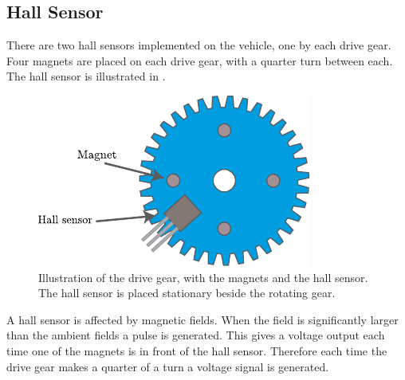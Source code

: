 \subsection{Hall Sensor}
There are two hall sensors implemented on the vehicle, one by each drive gear. Four magnets are placed on each drive gear, with a quarter turn between each. The hall sensor is illustrated in .

\begin{figure}[H]
	\centering
	\includegraphics[scale=1.2]{figures/hallSensorDrawing.pdf}
	\caption{Illustration of the drive gear, with the magnets and the hall sensor. The hall sensor is placed stationary beside the rotating gear\cite{KHSoerensen}.}
	\label{HallSensor}
\end{figure}

A hall sensor is affected by magnetic fields. When the field is significantly larger than the ambient fields a pulse is generated. This gives a voltage output each time one of the magnets is in front of the hall sensor. Therefore each time the drive gear makes a quarter of a turn a voltage signal is generated.

%
%
